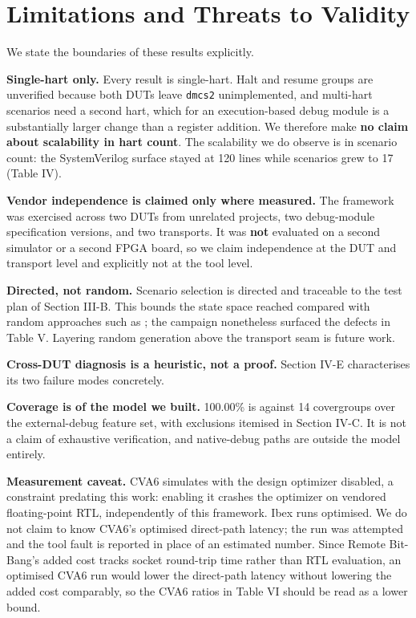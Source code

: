 \documentclass[conference]{IEEEtran}
\begin{document}
\section{Limitations and Threats to Validity}
We state the boundaries of these results explicitly.

\textbf{Single-hart only.} Every result is single-hart. Halt and resume groups are unverified because both DUTs leave \texttt{dmcs2} unimplemented, and multi-hart scenarios need a second hart, which for an execution-based debug module is a substantially larger change than a register addition. We therefore make \textbf{no claim about scalability in hart count}. The scalability we do observe is in scenario count: the SystemVerilog surface stayed at 120 lines while scenarios grew to 17 (Table IV).

\textbf{Vendor independence is claimed only where measured.} The framework was exercised across two DUTs from unrelated projects, two debug-module specification versions, and two transports. It was \textbf{not} evaluated on a second simulator or a second FPGA board, so we claim independence at the DUT and transport level and explicitly not at the tool level.

\textbf{Directed, not random.} Scenario selection is directed and traceable to the test plan of Section III-B. This bounds the state space reached compared with random approaches such as \cite{b2}; the campaign nonetheless surfaced the defects in Table V. Layering random generation above the transport seam is future work.

\textbf{Cross-DUT diagnosis is a heuristic, not a proof.} Section IV-E characterises its two failure modes concretely.

\textbf{Coverage is of the model we built.} 100.00\% is against 14 covergroups over the external-debug feature set, with exclusions itemised in Section IV-C. It is not a claim of exhaustive verification, and native-debug paths are outside the model entirely.

\textbf{Measurement caveat.} CVA6 simulates with the design optimizer disabled, a constraint predating this work: enabling it crashes the optimizer on vendored floating-point RTL, independently of this framework. Ibex runs optimised. We do not claim to know CVA6's optimised direct-path latency; the run was attempted and the tool fault is reported in place of an estimated number. Since Remote Bit-Bang's added cost tracks socket round-trip time rather than RTL evaluation, an optimised CVA6 run would lower the direct-path latency without lowering the added cost comparably, so the CVA6 ratios in Table VI should be read as a lower bound.
\end{document}
